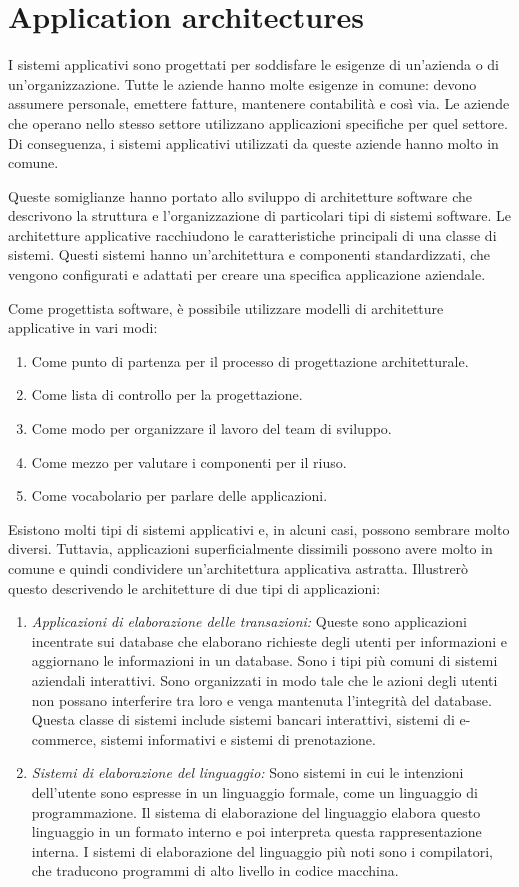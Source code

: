 \section{Application architectures}
I sistemi applicativi sono progettati per soddisfare le esigenze di un'azienda o di un'organizzazione. Tutte le aziende hanno molte esigenze in comune: devono assumere personale, emettere fatture, mantenere contabilità e così via. Le aziende che operano nello stesso settore utilizzano applicazioni specifiche per quel settore. Di conseguenza, i sistemi applicativi utilizzati da queste aziende hanno molto in comune.

Queste somiglianze hanno portato allo sviluppo di architetture software che descrivono la struttura e l’organizzazione di particolari tipi di sistemi software. Le architetture applicative racchiudono le caratteristiche principali di una classe di sistemi. Questi sistemi hanno un'architettura e componenti standardizzati, che vengono configurati e adattati per creare una specifica applicazione aziendale.

Come progettista software, è possibile utilizzare modelli di architetture applicative in vari modi:
\begin{enumerate}
    \item Come punto di partenza per il processo di progettazione architetturale.
    \item Come lista di controllo per la progettazione.
    \item Come modo per organizzare il lavoro del team di sviluppo.
    \item Come mezzo per valutare i componenti per il riuso.
    \item Come vocabolario per parlare delle applicazioni.
\end{enumerate}
Esistono molti tipi di sistemi applicativi e, in alcuni casi, possono sembrare molto diversi. Tuttavia, applicazioni superficialmente dissimili possono avere molto in comune e quindi condividere un'architettura applicativa astratta. Illustrerò questo descrivendo le architetture di due tipi di applicazioni:
\begin{enumerate}
    \item \textit{Applicazioni di elaborazione delle transazioni:} Queste sono applicazioni incentrate sui database che elaborano richieste degli utenti per informazioni e aggiornano le informazioni in un database. Sono i tipi più comuni di sistemi aziendali interattivi. Sono organizzati in modo tale che le azioni degli utenti non possano interferire tra loro e venga mantenuta l'integrità del database. Questa classe di sistemi include sistemi bancari interattivi, sistemi di e-commerce, sistemi informativi e sistemi di prenotazione.
    \item \textit{Sistemi di elaborazione del linguaggio:} Sono sistemi in cui le intenzioni dell'utente sono espresse in un linguaggio formale, come un linguaggio di programmazione. Il sistema di elaborazione del linguaggio elabora questo linguaggio in un formato interno e poi interpreta questa rappresentazione interna. I sistemi di elaborazione del linguaggio più noti sono i compilatori, che traducono programmi di alto livello in codice macchina.
\end{enumerate}

